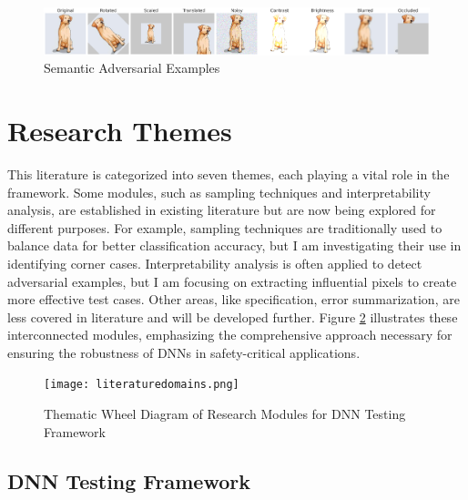   \begin{figure}
    \centering
    \includegraphics[width=\linewidth]{figures/output_update.png}
    \caption{Semantic Adversarial Examples}
    \label{fig:image-trans}
  \end{figure}


\section{Research Themes}
 This literature is categorized into seven themes, each playing a vital role in the framework. Some modules, such as sampling techniques and interpretability analysis, are established in existing literature but are now being explored for different purposes. For example, sampling techniques are traditionally used to balance data for better classification accuracy, but I am investigating their use in identifying corner cases. Interpretability analysis is often applied to detect adversarial examples, but I am focusing on extracting influential pixels to create more effective test cases. Other areas, like specification, error summarization, are less covered in literature and will be developed further. Figure \ref{fig:thematic_wheel} illustrates these interconnected modules, emphasizing the comprehensive approach necessary for ensuring the robustness of DNNs in safety-critical applications. 

\begin{figure}[h]
  \centering
  \texttt{[image: literaturedomains.png]}
  \caption{Thematic Wheel Diagram of Research Modules for DNN Testing Framework}
  \label{fig:thematic_wheel}
\end{figure}

\subsection{DNN Testing Framework}

